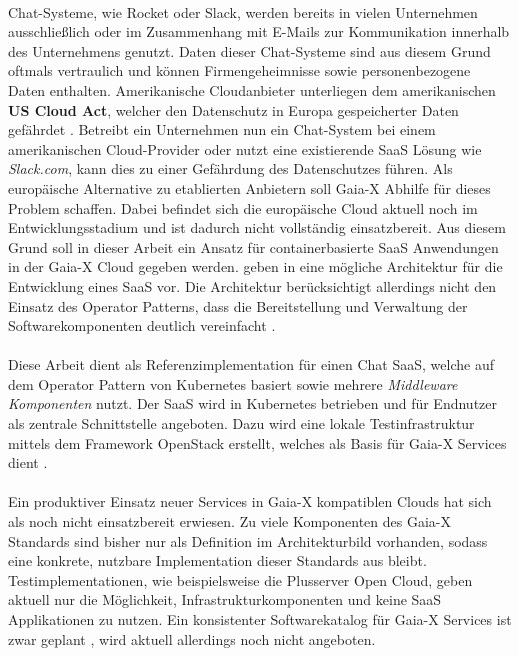 \paragraph{}
Chat-Systeme, wie Rocket oder Slack, werden bereits in vielen Unternehmen ausschließlich oder im Zusammenhang mit E-Mails
zur Kommunikation innerhalb des Unternehmens genutzt. Daten dieser Chat-Systeme sind aus diesem Grund oftmals vertraulich
und können Firmengeheimnisse sowie personenbezogene Daten enthalten. 
Amerikanische Cloudanbieter unterliegen dem amerikanischen \textbf{US Cloud Act}, welcher
den Datenschutz in Europa gespeicherter Daten gefährdet \cite{Kagermann2021}.
Betreibt ein Unternehmen nun ein Chat-System bei einem amerikanischen Cloud-Provider oder nutzt eine existierende
\ac{SaaS} Lösung wie \emph{Slack.com}, kann dies zu einer Gefährdung des Datenschutzes führen.
Als europäische Alternative zu etablierten Anbietern soll Gaia-X Abhilfe für dieses Problem schaffen.
Dabei befindet sich die europäische Cloud aktuell noch im Entwicklungsstadium und ist dadurch nicht vollständig einsatzbereit.
Aus diesem Grund soll in dieser Arbeit ein Ansatz für containerbasierte \ac{SaaS} Anwendungen in der Gaia-X Cloud gegeben werden.
\citeauthor{Truyen2016} geben in \cite{Truyen2016} eine mögliche Architektur für die Entwicklung eines \acf{SaaS} vor.
Die Architektur berücksichtigt allerdings nicht den Einsatz des Operator Patterns, 
dass die Bereitstellung und Verwaltung der Softwarekomponenten deutlich vereinfacht \cite{Dobies2020}.

\paragraph{}
Diese Arbeit dient als Referenzimplementation für einen 
Chat \ac{SaaS}, welche auf dem Operator Pattern von Kubernetes basiert sowie mehrere \emph{Middleware Komponenten} nutzt.
Der \ac{SaaS} wird in Kubernetes betrieben und für Endnutzer als zentrale Schnittstelle angeboten.
Dazu wird eine lokale Testinfrastruktur mittels dem Framework OpenStack erstellt,
welches als Basis für Gaia-X Services dient \cite{scs}.

\paragraph{}
Ein produktiver Einsatz neuer Services in Gaia-X kompatiblen Clouds hat sich als noch nicht einsatzbereit erwiesen.
Zu viele Komponenten des Gaia-X Standards sind bisher nur als Definition im Architekturbild vorhanden, sodass eine konkrete,
nutzbare Implementation dieser Standards aus bleibt. 
Testimplementationen, wie beispielsweise die Plusserver Open Cloud, geben aktuell nur die Möglichkeit, Infrastrukturkomponenten
und keine \ac{SaaS} Applikationen zu nutzen. 
Ein konsistenter Softwarekatalog für Gaia-X Services ist zwar geplant \cite{BMWi2019},
wird aktuell allerdings noch nicht angeboten.

